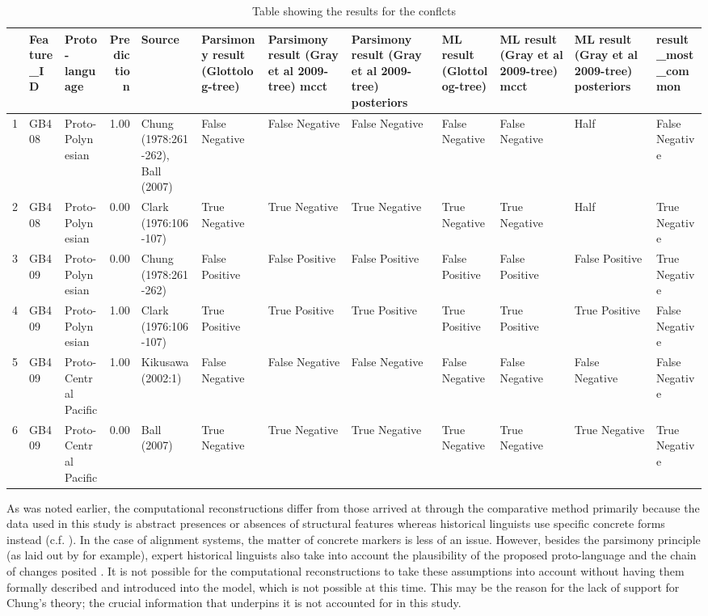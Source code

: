 \documentclass[draft,10pt]{article} %
\begin{document}
\begin{table}[ht]
\caption{Table showing the results for the conflcts}
\label{conflict_table}
\centering
\begin{tabular}{rllrllllllll}
  \hline
 & Feature\_ID & Proto-language & Prediction & Source & Parsimony result (Glottolog-tree) & Parsimony result (Gray et al 2009-tree) mcct & Parsimony result (Gray et al 2009-tree) posteriors & ML result (Glottolog-tree) & ML result (Gray et al 2009-tree) mcct & ML result (Gray et al 2009-tree) posteriors & result\_most\_common \\ 
  \hline
1 & GB408 & Proto-Polynesian & 1.00 & Chung (1978:261-262), Ball (2007) & False Negative & False Negative & False Negative & False Negative & False Negative & Half & False Negative \\ 
  2 & GB408 & Proto-Polynesian & 0.00 & Clark (1976:106-107) & True Negative & True Negative & True Negative & True Negative & True Negative & Half & True Negative \\ 
  3 & GB409 & Proto-Polynesian & 0.00 & Chung (1978:261-262) & False Positive & False Positive & False Positive & False Positive & False Positive & False Positive & True Negative \\ 
  4 & GB409 & Proto-Polynesian & 1.00 & Clark (1976:106-107) & True Positive & True Positive & True Positive & True Positive & True Positive & True Positive & False Negative \\ 
  5 & GB409 & Proto-Central Pacific & 1.00 & Kikusawa (2002:1) & False Negative & False Negative & False Negative & False Negative & False Negative & False Negative & False Negative \\ 
  6 & GB409 & Proto-Central Pacific & 0.00 & Ball (2007) & True Negative & True Negative & True Negative & True Negative & True Negative & True Negative & True Negative \\ 
   \hline
\end{tabular}
\end{table}


As was noted earlier, the computational reconstructions differ from those arrived at through the comparative method primarily because the data used in this study is abstract presences or absences of structural features whereas historical linguists use specific concrete forms instead (c.f. \citet{crowley1985common}). In the case of alignment systems, the matter of concrete markers is less of an issue. However, besides the parsimony principle (as laid out by \citet[19]{clark1976aspects} for example), expert historical linguists also take into account the plausibility of the proposed proto-language and the chain of changes posited \citep{chung1977aspects}. It is not possible for the computational reconstructions to take these assumptions into account without having them formally described and introduced into the model, which is not possible at this time. This may be the reason for the lack of support for Chung's theory; the crucial information that underpins it is not accounted for in this study.
\end{document}
